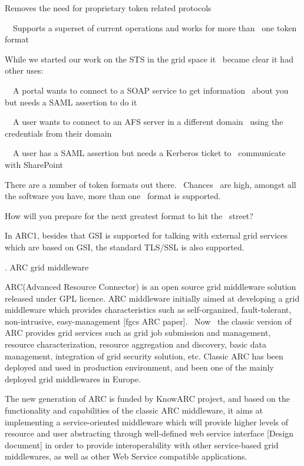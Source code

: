 \documentclass{article}
\begin{document}
Removes the need for proprietary token related protocols

\ \ Supports a superset of current operations and works for more than
\ one token format


\bigskip


\bigskip

While we started our work on the STS in the grid space it \ became clear
it had other uses:

\ \ A portal wants to connect to a SOAP service to get information
\ about you but needs a SAML assertion to do it

\ \ A user wants to connect to an AFS server in a different domain
\ using the credentials from their domain

\ \ A user has a SAML assertion but needs a Kerberos ticket to
\ communicate with SharePoint

There are a number of token formats out there. \ Chances \ are high,
amongst all the software you have, more than one \ format is supported.

How will you prepare for the next greatest format to hit the \ street?


\bigskip


\bigskip


\bigskip


\bigskip

In ARC1, besides that GSI is supported for talking with external grid
services which are based on GSI, the standard TLS/SSL is also
supported.


\bigskip

{. ARC grid middleware 
\par}

ARC(Advanced Resource Connector) is an open source grid middleware
solution released under GPL licence. ARC middleware initially aimed at
developing a grid middleware which provides characteristics such as
self-organized, fault-tolerant, non-intrusive, easy-management [fgcs
ARC paper]. \ Now \ the classic version of ARC provides grid services
such as grid job submission and management, resource characterization,
resource aggregation and discovery, basic data management, integration
of grid security solution, etc. Classic ARC has been deployed and used
in production environment, and been one of the mainly deployed grid
middlewares in Europe.

The new generation of ARC is funded by KnowARC project, and based on the
functionality and capabilities of the classic ARC middleware, it aims
at implementing a service-oriented middleware which will provide higher
levels of resource and user abstracting through well-defined web
service interface [Design document] in order to provide
interoperability with other service-based grid middlewares, as well as
other Web Service compatible applications.
\end{document}
